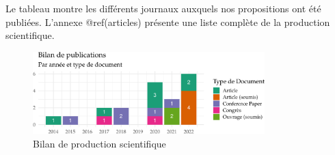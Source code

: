 \documentclass[
  11pt,
]{article}
\begin{document}
Le tableau montre les différents journaux auxquels nos propositions ont
été publiées. L'annexe @ref(articles) présente une liste complète de la
production scientifique.

\begin{figure}[H]

{\centering \includegraphics[width=0.8\textwidth,height=\textheight]{Figures/bilan-1.pdf}

}

\caption{Bilan de production scientifique}

\end{figure}
\end{document}
